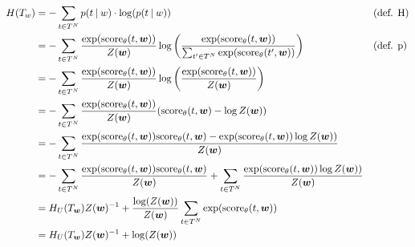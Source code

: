 \documentclass[a4paper,12pt]{ETHexercise}
\begin{document}
\begin{question}
\begin{subquestion}
		\begin{align}
			H(T_w) & = -\sum_{t \in T^{N}} p(t \:|\: w) \cdot \log(p(t \:|\: w))                                                                                                         &  & \text{(def. H)} \\
			       & = -\sum_{t \in T^{N}} \frac{\exp(\text{score}_{\theta}(t, \boldsymbol{w}))}{Z(\boldsymbol{w})} \log \left( \frac{\exp(\text{score}_{\theta}(t, \boldsymbol{w}))}{\sum_{t' \in T^N} \exp(\text{score}_{\theta}(t', \boldsymbol{w}))} \right)                   &  & \text{(def. p)} \\
			       & = -\sum_{t \in T^{N}} \frac{\exp(\text{score}_{\theta}(t, \boldsymbol{w}))}{Z(\boldsymbol{w})} \log \left( \frac{\exp(\text{score}_{\theta}(t, \boldsymbol{w}))}{Z(\boldsymbol{w})} \right)                                                          \\
			       & = -\sum_{t \in T^{N}} \frac{\exp(\text{score}_{\theta}(t, \boldsymbol{w}))}{Z(\boldsymbol{w})} (\text{score}_{\theta}(t, \boldsymbol{w}) - \log Z(\boldsymbol{w}))                                                                                   \\
			       & = -\sum_{t \in T^{N}} \frac{\exp(\text{score}_{\theta}(t, \boldsymbol{w})) \text{score}_{\theta}(t, \boldsymbol{w}) - \exp(\text{score}_{\theta}(t, \boldsymbol{w})) \log Z(\boldsymbol{w}))}{Z(\boldsymbol{w})}                                                                   \\
			       & = -\sum_{t \in T^{N}} \frac{\exp(\text{score}_{\theta}(t, \boldsymbol{w})) \text{score}_{\theta}(t, \boldsymbol{w})}{Z(\boldsymbol{w})} + \sum_{t \in T^{N}} \frac{\exp(\text{score}_{\theta}(t, \boldsymbol{w})) \log Z(\boldsymbol{w}))}{Z(\boldsymbol{w})}                      \\
			       & = H_U(T_{\boldsymbol{w}}) Z(\boldsymbol{w})^{-1}  + \frac{\log(Z(\boldsymbol{w}))}{Z(\boldsymbol{w})} \sum_{t \in T^{N}} \exp(\text{score}_{\theta}(t, \boldsymbol{w}))                                                \\
			       & = H_U(T_{\boldsymbol{w}}) Z(\boldsymbol{w})^{-1}  + \log(Z(\boldsymbol{w}))                                                                                                              \\
		\end{align}
	\end{subquestion}
\end{question}
\end{document}
